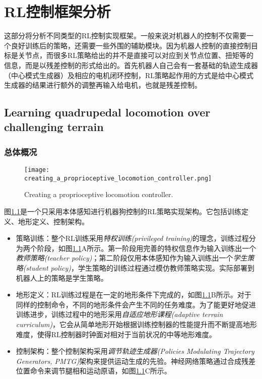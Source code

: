 
\chapter{RL控制框架分析}

这部分将分析不同类型的RL控制实现框架。一般来说对机器人的控制不仅需要一个良好训练后的策略，还需要一些外围的辅助模块。因为机器人控制的直接控制目标是关节点，而很多RL策略给出的并不是直接可以对应到关节点位置、扭矩等的信息，而是以残差控制的形式给出的。首先机器人自己会有一套基础的轨迹生成器（中心模式生成器）及相应的电机闭环控制，RL策略起作用的方式是给中心模式生成器的结果进行额外的调整再输入给电机，也就是残差控制。

\section[RL案例1]{Learning quadrupedal locomotion over challenging terrain\cite[p7]{Lee_Hwangbo_Wellhausen_Koltun_Hutter_2020}}

\subsection[总体概况]{总体概况}

\begin{figure}
    \centering
    \texttt{[image: creating\_a\_proprioceptive\_locomotion\_controller.png]}
    \caption{Creating a proprioceptive locomotion controller\cite[p7]{Lee_Hwangbo_Wellhausen_Koltun_Hutter_2020}.}
    \label{fig:creating_a_proprioceptive_locomotion_controller}
  \end{figure}

  图\ref{fig:creating_a_proprioceptive_locomotion_controller}是一个只采用本体感知进行机器狗控制的RL策略实现架构。它包括训练定义、地形定义、控制架构。
  \begin{itemize}
    \item 策略训练：整个RL训练采用\emph{特权训练(privileged training)}\cite[p]{Chen_Zhou_Koltun_Krähenbühl_2019}的理念，训练过程分为两个阶段，如图\ref{fig:creating_a_proprioceptive_locomotion_controller}A所示。第一阶段用完善的特权信息作为输入训练出一个\emph{教师策略(teacher policy)}；第二阶段仅用本体感知作为输入训练出一个\emph{学生策略(student policy)}，学生策略的训练过程通过模仿教师策略实现。实际部署到机器人上的策略是学生策略。
    \item 地形定义：RL训练过程是在一定的地形条件下完成的，如图\ref{fig:creating_a_proprioceptive_locomotion_controller}B所示。对于同样的控制命令，不同的地形条件会产生不同的任务难度。为了能更好地促进训练进步，训练过程中的地形采用\emph{自适应地形课程(adaptive terrain curriculum)}，它会从简单地形开始根据训练控制器的性能提升而不断提高地形难度，使得RL控制器时钟面对相对于当前状况的中等地形难度。
    \item 控制架构：整个控制架构采用\emph{调节轨迹生成器(Policies Modulating Trajectory Generators, PMTG)\cite[p]{Iscen_Caluwaerts_Tan_Zhang_Coumans_Sindhwani_Vanhoucke_2018}}架构来提供运动生成的先验。神经网络策略通过合成残差位置命令来调节腿相和运动原语，如图\ref{fig:creating_a_proprioceptive_locomotion_controller}C所示。
  \end{itemize}


